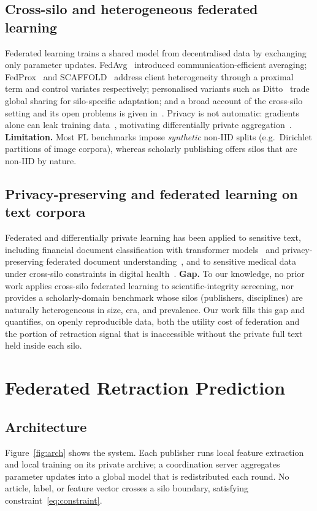 \documentclass[review,12pt]{elsarticle}
\begin{document}
\subsection{Cross-silo and heterogeneous federated learning}
Federated learning trains a shared model from decentralised data by exchanging
only parameter updates. FedAvg~\cite{ref_fedavg} introduced
communication-efficient averaging; FedProx~\cite{ref_fedprox} and
SCAFFOLD~\cite{ref_scaffold} address client heterogeneity through a proximal
term and control variates respectively; personalised variants such as
Ditto~\cite{ref_ditto} trade global sharing for silo-specific adaptation; and
a broad account of the cross-silo setting and its open problems is given
in~\cite{ref_kairouz}. Privacy is not automatic: gradients alone can leak
training data~\cite{ref_zhu}, motivating differentially private
aggregation~\cite{ref_dpfl}. \textbf{Limitation.} Most FL benchmarks impose
\emph{synthetic} non-IID splits (e.g.\ Dirichlet partitions of image corpora),
whereas scholarly publishing offers silos that are non-IID by nature.

\subsection{Privacy-preserving and federated learning on text corpora}
Federated and differentially private learning has been applied to sensitive
text, including financial document classification with transformer
models~\cite{ref_dpfin} and privacy-preserving federated document
understanding~\cite{ref_docvqa}, and to sensitive medical data under
cross-silo constraints in digital health~\cite{ref_rieke}. \textbf{Gap.} To our knowledge, no
prior work applies cross-silo federated learning to scientific-integrity
screening, nor provides a scholarly-domain benchmark whose silos (publishers,
disciplines) are naturally heterogeneous in size, era, and prevalence. Our
work fills this gap and quantifies, on openly reproducible data, both the
utility cost of federation and the portion of retraction signal that is
inaccessible without the private full text held inside each silo.

\section{Federated Retraction Prediction}
\label{sec:method}

\subsection{Architecture}
Figure~\ref{fig:arch} shows the system. Each publisher runs local feature
extraction and local training on its private archive; a coordination server
aggregates parameter updates into a global model that is redistributed each
round. No article, label, or feature vector crosses a silo boundary,
satisfying constraint~\eqref{eq:constraint}.
\end{document}
